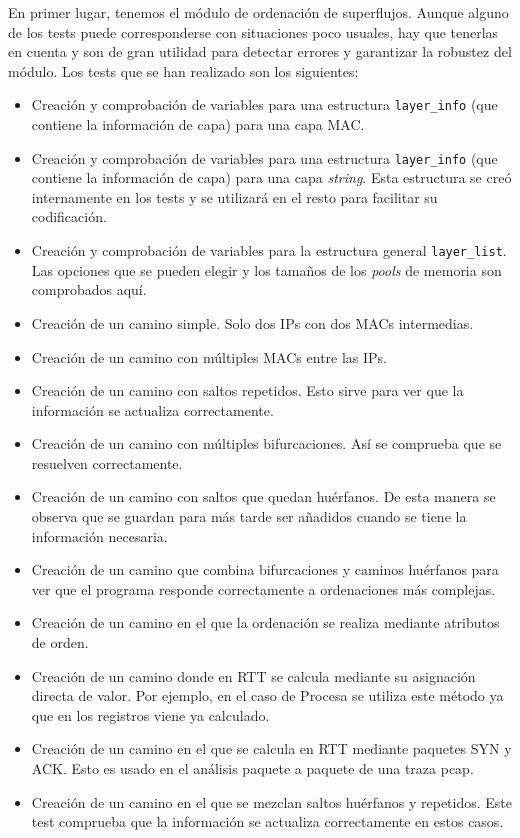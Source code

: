 \documentclass[tfg,epsbased,lof,lot,loa,final,nocopyright,overleaf]{tfgtfmthesisuam}
\begin{document}
En primer lugar, tenemos el módulo de ordenación de superflujos. Aunque alguno de los tests puede corresponderse con situaciones poco usuales, hay que tenerlas en cuenta y son de gran utilidad para detectar errores y garantizar la robustez del módulo. Los tests que se han realizado son los siguientes:
\begin{itemize}
	\item Creación y comprobación de variables para una estructura \texttt{layer\_info} (que contiene la información de capa) para una capa MAC.
	\item Creación y comprobación de variables para una estructura \texttt{layer\_info} (que contiene la información de capa) para una capa \textit{string}. Esta estructura se creó internamente en los tests y se utilizará en el resto para facilitar su codificación.
	\item Creación y comprobación de variables para la estructura general \texttt{layer\_list}. Las opciones que se pueden elegir y los tamaños de los \textit{pools} de memoria son comprobados aquí.
	\item Creación de un camino simple. Solo dos IPs con dos MACs intermedias.
	\item Creación de un camino con múltiples MACs entre las IPs.
	\item Creación de un camino con saltos repetidos. Esto sirve para ver que la información se actualiza correctamente.
	\item Creación de un camino con múltiples bifurcaciones. Así se comprueba que se resuelven correctamente.
	\item Creación de un camino con saltos que quedan huérfanos. De esta manera se observa que se guardan para más tarde ser añadidos cuando se tiene la información necesaria.
	\item Creación de un camino que combina bifurcaciones y caminos huérfanos para ver que el programa responde correctamente a ordenaciones más complejas.
	\item Creación de un camino en el que la ordenación se realiza mediante atributos de orden.
	\item Creación de un camino donde en RTT se calcula mediante su asignación directa de valor. Por ejemplo, en el caso de Procesa se utiliza este método ya que en los registros viene ya calculado.
	\item Creación de un camino en el que se calcula en RTT mediante paquetes SYN y ACK. Esto es usado en el análisis paquete a paquete de una traza pcap.
	\item Creación de un camino en el que se mezclan saltos huérfanos y repetidos. Este test comprueba que la información se actualiza correctamente en estos casos.
\end{itemize}
\end{document}
